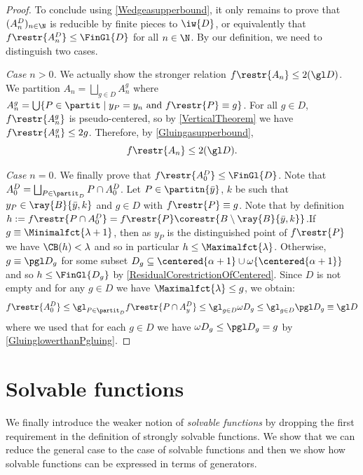 \begin{proof}
To conclude using \cref{Wedgeasupperbound}, it only remains to prove that $(A^D_n)_{n\in\N}$ is reducible by finite pieces to $\iw{D}$, or equivalently that $f\restr{A^D_n}\leq\FinGl{D}$ for all $n\in\N$.
By our definition, we need to distinguish two cases.

\textit{Case $n>0$.} We actually show the stronger relation $f\restr{A_n}\leq 2(\gl D)$.
We partition $A_n=\bigsqcup_{g\in D} A^g_n$ where $A^g_n=\bigcup\{P\in\partit \mid y_P=y_n \text{ and } f\restr{P}\equiv g\}$.
For all $g\in D$, $f\restr{A^g_n}$ is pseudo-centered, so by \cref{VerticalTheorem} we have $f\restr{A^g_n}\leq 2g$.
Therefore, by \cref{Gluingasupperbound},
\[ f\restr{A_n}\leq 2 (\gl D).\]


\textit{Case $n=0$.} We finally prove that $f\restr{A^D_0} \leq \FinGl{D}$. Note that $A^D_0=\bigsqcup_{P\in \partit_D}P\cap A^D_0$. Let $P\in \partitn{\bar{y}}$, $k$ be such that $y_P\in \ray{B}{\bar{y},k}$ and $g\in D$ with $f\restr{P}\equiv g$. Note that by definition $h:=f\restr{P\cap A^D_0}=f\restr{P}\corestr{B\setminus \ray{B}{\bar{y},k}}$.{If $g\equiv \Minimalfct{\lambda+1}$, then as $y_P$ is the distinguished point of $f\restr{P}$ we have $\CB(h)< \lambda$ }and so in particular $h\leq \Maximalfct{\lambda}$. Otherwise, $g\equiv \pgl D_g$ for some subset $D_g\subseteq  \centered{\alpha+1}\cup \omega \{\centered{\alpha+1}\}$ and so $h\leq \FinGl{D_g}$ by \cref{ResidualCorestrictionOfCentered}. Since $D$ is not empty and for any $g\in D$ we have $\Maximalfct{\lambda}\leq g$, we obtain:
\[
f\restr{A^D_0}\leq \gl_{P\in\partit_D} f\restr{P\cap A^D_y} \leq \gl_{g\in D}\omega D_g \leq  \gl_{g\in D}\pgl D_g \equiv \gl D 
\]
where we used that for each $g\in D$ we have $\omega D_g\leq \pgl D_g=g$ by \cref{GluinglowerthanPgluing}.
\end{proof}


\section{Solvable functions}
We finally introduce the weaker notion of \emph{solvable functions} by dropping the first requirement in the definition of strongly solvable functions.
We show that we can reduce the general case to the case of solvable functions and then we show how solvable functions can be expressed in terms of generators.  

